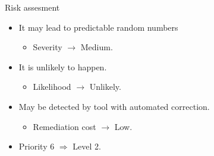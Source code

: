 \begin{frame}[t]{Risk assesment}
\begin{itemize}
  \item It may lead to predictable random numbers
    \begin{itemize}
      \item Severity $\rightarrow$ Medium.
    \end{itemize}

  \vfill
  \item It is unlikely to happen.
    \begin{itemize}
      \item Likelihood $\rightarrow$ Unlikely.
    \end{itemize}

  \vfill
  \item May be detected by tool with automated correction.
    \begin{itemize}
      \item Remediation cost $\rightarrow$ Low.
    \end{itemize}

  \vfill
  \item Priority 6 $\Rightarrow$ Level 2.
\end{itemize}
\end{frame}
